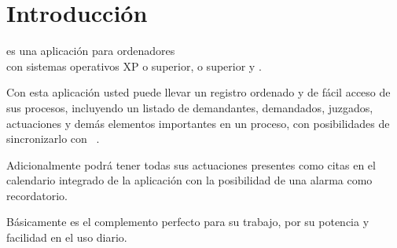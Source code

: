 \chapter{Introducci\'on}
\label{sec:intro}
\softwareAbogadosDesktop es una aplicaci\'on para ordenadores \\con
sistemas operativos \microsoft \windows XP o superior,  o superior y \linux. 

Con esta aplicaci\'on usted puede llevar un registro ordenado y de f\'acil acceso de sus procesos, incluyendo un listado de demandantes, demandados, juzgados, actuaciones y dem\'as elementos importantes
en un proceso, con posibilidades de sincronizarlo con  \softwareAbogadosMobile.

Adicionalmente podr\'a tener todas sus actuaciones presentes como citas en el
calendario integrado de la aplicaci\'on con la posibilidad de una alarma como
recordatorio.

B\'asicamente \softwareAbogadosDesktop es el complemento perfecto para su
trabajo, por su potencia y facilidad en el uso diario.